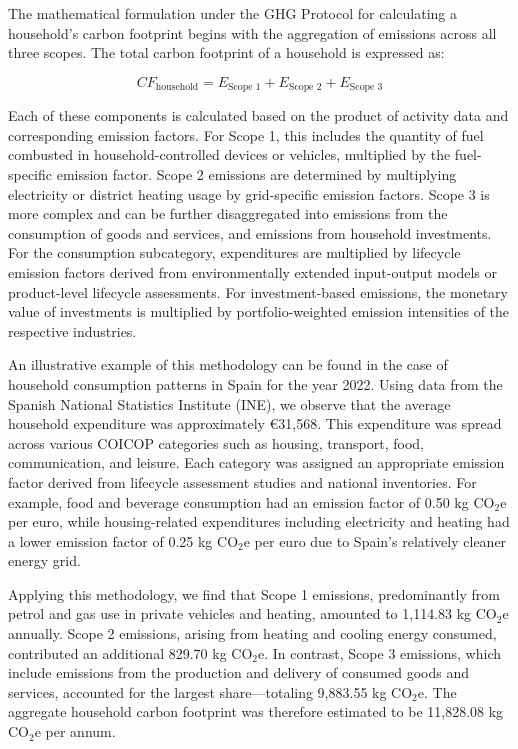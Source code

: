 \documentclass[12pt,a4paper]{article}
\begin{document}
The mathematical formulation under the GHG Protocol for calculating a household’s carbon footprint begins with the aggregation of emissions across all three scopes. The total carbon footprint of a household is expressed as:

\begin{equation}
CF_{\text{household}} = E_{\text{Scope 1}} + E_{\text{Scope 2}} + E_{\text{Scope 3}}
\end{equation}

Each of these components is calculated based on the product of activity data and corresponding emission factors. For Scope 1, this includes the quantity of fuel combusted in household-controlled devices or vehicles, multiplied by the fuel-specific emission factor. Scope 2 emissions are determined by multiplying electricity or district heating usage by grid-specific emission factors. Scope 3 is more complex and can be further disaggregated into emissions from the consumption of goods and services, and emissions from household investments. For the consumption subcategory, expenditures are multiplied by lifecycle emission factors derived from environmentally extended input-output models or product-level lifecycle assessments. For investment-based emissions, the monetary value of investments is multiplied by portfolio-weighted emission intensities of the respective industries.

An illustrative example of this methodology can be found in the case of household consumption patterns in Spain for the year 2022. Using data from the Spanish National Statistics Institute (INE), we observe that the average household expenditure was approximately €31,568. This expenditure was spread across various COICOP categories such as housing, transport, food, communication, and leisure. Each category was assigned an appropriate emission factor derived from lifecycle assessment studies and national inventories. For example, food and beverage consumption had an emission factor of 0.50 kg CO$_2$e per euro, while housing-related expenditures including electricity and heating had a lower emission factor of 0.25 kg CO$_2$e per euro due to Spain’s relatively cleaner energy grid.

Applying this methodology, we find that Scope 1 emissions, predominantly from petrol and gas use in private vehicles and heating, amounted to 1,114.83 kg CO$_2$e annually. Scope 2 emissions, arising from heating and cooling energy consumed, contributed an additional 829.70 kg CO$_2$e. In contrast, Scope 3 emissions, which include emissions from the production and delivery of consumed goods and services, accounted for the largest share—totaling 9,883.55 kg CO$_2$e. The aggregate household carbon footprint was therefore estimated to be 11,828.08 kg CO$_2$e per annum.
\end{document}

